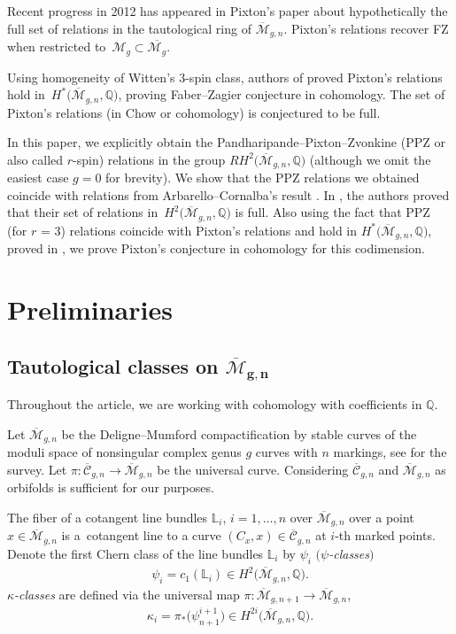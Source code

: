 \documentclass[pdftex]{sigma}
\def\oM{\overline{\mathcal{M}}}
\numberwithin{equation}{section}
\begin{document}
Recent progress in 2012 has appeared in Pixton's paper \cite{Pix} about hypothetically the full set of relations in the tautological ring of $\oM_{g,n}$. Pixton's relations recover FZ when restricted to~${\mathcal{M}_{g}\subset \overline{\mathcal{M}_{g}}}$.

Using homogeneity of Witten's 3-spin class,
authors of \cite{PPZ} proved Pixton's relations hold in~$H^*\big(\oM_{g,n},\mathbb{Q}\big)$, proving Faber--Zagier conjecture in cohomology.
The set of Pixton's relations (in Chow or cohomology) is conjectured to be full.

In this paper, we explicitly obtain the Pandharipande--Pixton--Zvonkine (PPZ or also called $r$-spin) relations \cite{PPZ,PPZ16} in the group $RH^2\big(\oM_{g,n},\mathbb{Q}\big)$
(although we omit the easiest case $g=0$ for brevity). We show that the PPZ relations we obtained coincide with relations from Arbarello--Cornalba's result \cite[Theorem 2.2]{Cor}. In \cite{Cor}, the authors proved that their set of relations in~$H^2\big(\oM_{g,n},\mathbb{Q}\big)$ is full. Also
using the fact that PPZ (for $r$ = 3) relations coincide with Pixton's relations and hold in $H^*\big(\oM_{g,n}, \mathbb{Q}\big)$, proved in \cite{PPZ}, we prove Pixton's conjecture in cohomology for this codimension.

\section{Preliminaries}
\subsection[Tautological classes on M\_\{g,n\}]{Tautological classes on $\boldsymbol{\oM_{g,n}}$}

Throughout the article, we are working with cohomology with coefficients in $\mathbb{Q}$.

Let $\oM_{g,n}$ be the Deligne--Mumford compactification by stable curves of the moduli space of nonsingular complex genus $g$ curves with $n$ markings, see \cite{Z} for the survey. Let
$
\pi\colon \overline{\mathcal{C}}_{g,n} \to \overline{\mathcal{M}}_{g,n}
$
be the universal curve. Considering $\overline{\mathcal{C}}_{g,n}$ and $\overline{\mathcal{M}}_{g,n}$ as orbifolds is sufficient for our purposes.

The fiber of a cotangent line bundles $\mathbb{L}_i$, $i=1,\dots,n$ over $\oM_{g,n}$ over a point $x \in \oM_{g,n}$ is a~cotangent line to a curve $(C_x,x)\in \overline{\mathcal{C}}_{g,n}$ at $i$-th marked points.
Denote the first Chern class of the line bundles $\mathbb{L}_i$ by $\psi_i$ {$($\em $\psi$-classes$)$}
\begin{align*}
\psi_i = c_1(\mathbb{L}_i)\in H^2\big(\oM_{g,n},\mathbb{Q}\big).
\end{align*}
{\em $\kappa$-classes} are defined via the universal map $\pi\colon \oM_{g,n+1} \to \oM_{g,n}$,
\begin{align*}
\kappa_i = \pi_{*}\big(\psi^{i+1}_{n+1}\big)\in H^{2i}\big(\oM_{g,n},\mathbb{Q}\big).
\end{align*}
\end{document}
